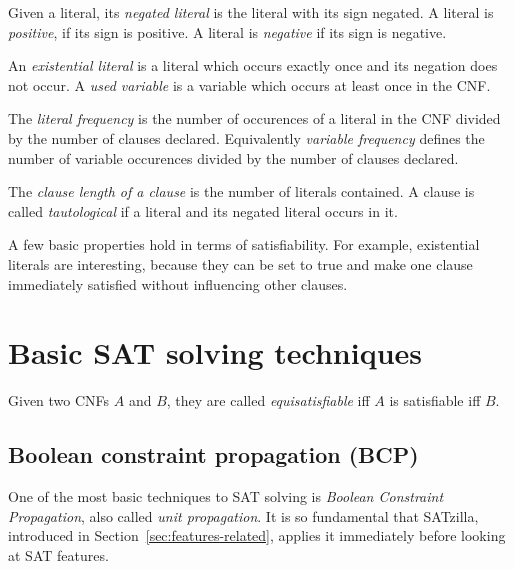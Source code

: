 \begin{defi}
  Given a literal, its \emph{negated literal} is the literal with its sign negated.
  A literal is \emph{positive}, if its sign is positive. A literal is \emph{negative} if its sign is negative.

  An \emph{existential literal} is a literal which occurs exactly once and
  its negation does not occur. A \emph{used variable} is a variable which
  occurs at least once in the CNF.

  The \emph{literal frequency} is the number of occurences of a literal in the CNF divided by the number of clauses declared.
  Equivalently \emph{variable frequency} defines the number of variable occurences divided by the number of clauses declared.
\end{defi}

\begin{defi}
  The \emph{clause length of a clause} is the number of literals contained.
  A clause is called \emph{tautological} if a literal and its negated literal occurs in it.
\end{defi}

A few basic properties hold in terms of satisfiability. For example, existential literals
are interesting, because they can be set to true and make one clause immediately satisfied
without influencing other clauses.

\section{Basic SAT solving techniques}
\label{sec:sat-solving}
%
\begin{defi}
  Given two CNFs $A$ and $B$, they are called \emph{equisatisfiable}
  iff $A$ is satisfiable iff $B$.
\end{defi}

\subsection{Boolean constraint propagation (BCP)}
\label{sec:sat-bcp}
%
One of the most basic techniques to SAT solving is \emph{Boolean Constraint Propagation},
also called \emph{unit propagation}.
It is so fundamental that SATzilla, introduced in Section~\ref{sec:features-related},
applies it immediately before looking at SAT features.

